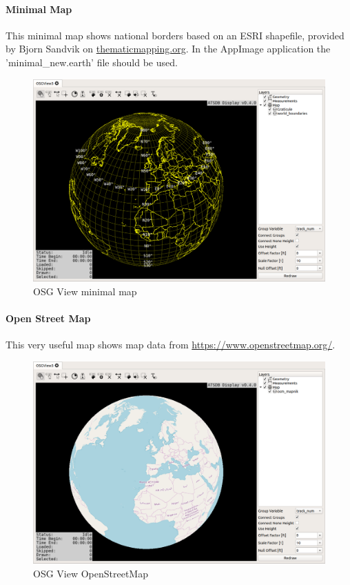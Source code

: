 {\newpage
\paragraph{Minimal Map}

This minimal map shows national borders based on an ESRI shapefile, provided by Bjorn Sandvik on \url{thematicmapping.org}. In the AppImage application the 'minimal\_new.earth' file should be used.

\begin{figure}[H]
    \hspace*{-2cm}
    \includegraphics[width=18cm,frame]{../screenshots/osgview_minimal.png}
  \caption{OSG View minimal map}
\end{figure}

\newpage
\paragraph{Open Street Map}

This very useful map shows map data from \url{https://www.openstreetmap.org/}.

\begin{figure}[H]
    \hspace*{-2cm}
    \includegraphics[width=18cm,frame]{../screenshots/osgview_osm.png}
  \caption{OSG View OpenStreetMap}
\end{figure}

}
